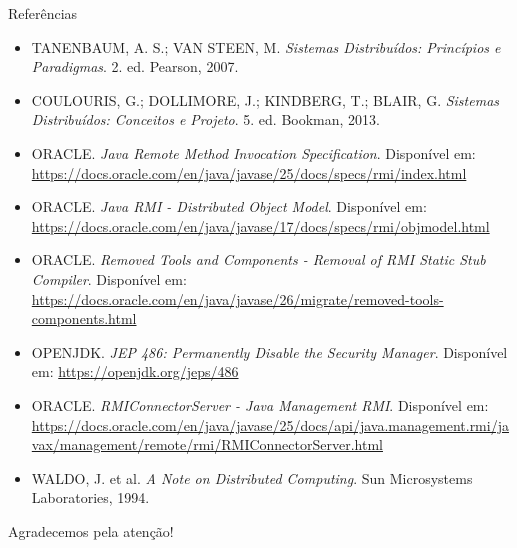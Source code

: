 \documentclass[aspectratio=169]{beamer}
\begin{document}
\begin{frame}{Referências}
    \scriptsize
    \begin{itemize}
        \item TANENBAUM, A. S.; VAN STEEN, M. \textit{Sistemas Distribuídos: Princípios e Paradigmas}. 2. ed. Pearson, 2007.
        \item COULOURIS, G.; DOLLIMORE, J.; KINDBERG, T.; BLAIR, G. \textit{Sistemas Distribuídos: Conceitos e Projeto}. 5. ed. Bookman, 2013.
        \item ORACLE. \textit{Java Remote Method Invocation Specification}. Disponível em: \url{https://docs.oracle.com/en/java/javase/25/docs/specs/rmi/index.html}
        \item ORACLE. \textit{Java RMI - Distributed Object Model}. Disponível em: \url{https://docs.oracle.com/en/java/javase/17/docs/specs/rmi/objmodel.html}
        \item ORACLE. \textit{Removed Tools and Components - Removal of RMI Static Stub Compiler}. Disponível em: \url{https://docs.oracle.com/en/java/javase/26/migrate/removed-tools-components.html}
        \item OPENJDK. \textit{JEP 486: Permanently Disable the Security Manager}. Disponível em: \url{https://openjdk.org/jeps/486}
        \item ORACLE. \textit{RMIConnectorServer - Java Management RMI}. Disponível em: \url{https://docs.oracle.com/en/java/javase/25/docs/api/java.management.rmi/javax/management/remote/rmi/RMIConnectorServer.html}
        \item WALDO, J. et al. \textit{A Note on Distributed Computing}. Sun Microsystems Laboratories, 1994.
    \end{itemize}
\end{frame}

\begin{frame}
    \centering
    \vspace{1cm}
    {\Huge Agradecemos pela atenção!}
\end{frame}
\end{document}
